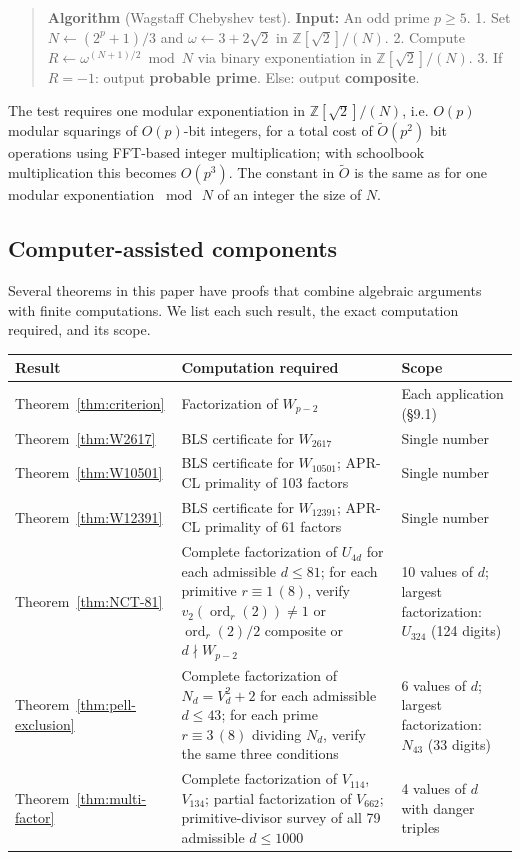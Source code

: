 \documentclass[12pt]{article}
\theoremstyle{plain}
\theoremstyle{definition}
\theoremstyle{remark}
\begin{document}
\begin{quote}
\textbf{Algorithm} (Wagstaff Chebyshev test).
\textbf{Input:} An odd prime \(p \geq 5\).
1. Set \(N \leftarrow (2^p + 1)/3\) and
\(\omega \leftarrow 3 + 2\sqrt{2}\) in \(\mathbb{Z}[\sqrt{2}]/(N)\).
2. Compute \(R \leftarrow \omega^{(N+1)/2} \bmod N\) via binary
exponentiation in \(\mathbb{Z}[\sqrt{2}]/(N)\).
3. If \(R = -1\): output \textbf{probable prime}.
Else: output \textbf{composite}.
\end{quote}

The test requires one modular exponentiation in
\(\mathbb{Z}[\sqrt{2}]/(N)\), i.e. \(O(p)\) modular squarings of
\(O(p)\)-bit integers, for a total cost of \(\widetilde{O}(p^2)\)
bit operations using FFT-based integer multiplication; with
schoolbook multiplication this becomes \(O(p^3)\). The constant in
\(\widetilde{O}\) is the same as for one modular exponentiation
\(\bmod\, N\) of an integer the size of \(N\).

\subsection{Computer-assisted components}


Several theorems in this paper have proofs that combine algebraic
arguments with finite computations. We list each such result, the
exact computation required, and its scope.

\begin{center}
\begin{tabular}{lp{6.2cm}p{4.5cm}}
\hline
Result & Computation required & Scope \\
\hline
Theorem~\ref{thm:criterion} & Factorization of \(W_{p-2}\) & Each application (\S9.1) \\
Theorem~\ref{thm:W2617} & BLS certificate for \(W_{2617}\) & Single number \\
Theorem~\ref{thm:W10501} & BLS certificate for \(W_{10501}\); APR-CL primality of 103 factors & Single number \\
Theorem~\ref{thm:W12391} & BLS certificate for \(W_{12391}\); APR-CL primality of 61 factors & Single number \\
Theorem~\ref{thm:NCT-81} & Complete factorization of \(U_{4d}\) for each admissible \(d \leq 81\); for each primitive \(r \equiv 1\,(8)\), verify \(v_2(\operatorname{ord}_r(2)) \neq 1\) or \(\operatorname{ord}_r(2)/2\) composite or \(d \nmid W_{p-2}\) & 10 values of \(d\); largest factorization: \(U_{324}\) (124 digits) \\
Theorem~\ref{thm:pell-exclusion} & Complete factorization of \(N_d = V_d^2+2\) for each admissible \(d \leq 43\); for each prime \(r \equiv 3\,(8)\) dividing \(N_d\), verify the same three conditions & 6 values of \(d\); largest factorization: \(N_{43}\) (33 digits) \\
Theorem~\ref{thm:multi-factor} & Complete factorization of \(V_{114}\), \(V_{134}\); partial factorization of \(V_{662}\); primitive-divisor survey of all 79 admissible \(d \leq 1000\) & 4 values of \(d\) with danger triples \\
\hline
\end{tabular}
\end{center}
\end{document}

